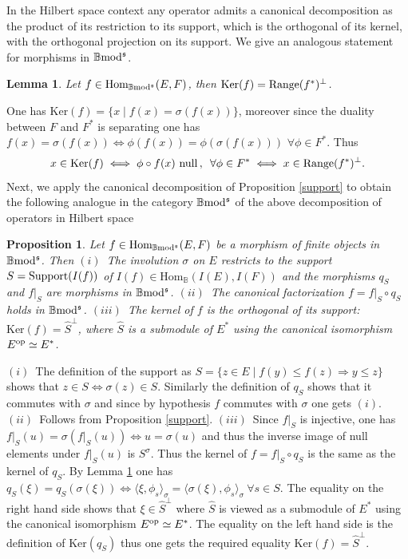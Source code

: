 \documentclass[12pt]{article}
\newtheorem{prop}[thm]{Proposition}
\newtheorem{lem}[thm]{Lemma}
\def\Hom{{\rm Hom}}
\def\B{{\mathbb B}}
\def\qqq{\,,\,~\forall}
\def\ker{{\mbox{Ker}}}
\def\Hom {{\mbox{Hom}}}
\def\b2{{\rm \B mod^{\mathfrak s}}}
\begin{document}
   In the Hilbert space context any operator admits a canonical decomposition as the product of its restriction to its support, which is the orthogonal of its kernel, with the orthogonal projection on its support. We give an analogous statement for morphisms in $\b2$.
    \begin{lem}\label{ortho proj} Let $f\in \Hom_\b2(E,F)$, then $\ker(f)={\rm Range}(f^*)^\perp$.
      \end{lem}
   \proof  One has $\ker(f)=\{x\mid f(x)=\sigma(f(x))\}$, moreover since the duality between $F$ and $F^*$ is separating one has $f(x)=\sigma(f(x))\iff \phi(f(x))=\phi(\sigma(f(x)))$ $\forall \phi\in F^*$. Thus 
   $$
   x\in \ker(f)\iff \phi\circ f(x)\ {\rm null}\qqq \phi\in F^*\iff x\in {\rm Range}(f^*)^\perp.
   $$
      \endproof    
   Next, we apply the canonical decomposition of Proposition \ref{support} to obtain the
   following analogue in the category $\b2$ of  the above decomposition of operators in Hilbert space    
   \begin{prop}\label{support bmods} Let $f\in \Hom_\b2(E,F)$ be a morphism of finite objects in $\b2$. Then\newline
   $(i)$~The involution $\sigma$ on $E$ restricts to the support $S={\rm Support}(I(f))$ of $I(f)\in \Hom_\B(I(E),I(F))$ and the morphisms $q_S$ and $f\vert_S$ are morphisms in $\b2$.\newline
   $(ii)$~The canonical factorization $f=f\vert_S\circ q_S$ holds in $\b2$.\newline
   $(iii)$~The kernel of $f$ is the orthogonal of its support:
   $
   \ker(f)=\hat S^\perp
   $, 
   where $\hat S$ is a submodule of $E^*$ using the canonical isomorphism $E^{\rm op}\simeq E^*$.   	
  \end{prop}
   \proof $(i)$~The definition of the support as $S=\{z\in E\mid f(y)\leq f(z)\Rightarrow y\leq z\}$ shows that $z\in S\iff \sigma(z)\in S$. Similarly the definition of $q_S$ shows that it commutes with $\sigma$ and since by hypothesis $f$ commutes with $\sigma$ one gets $(i)$.\newline
   $(ii)$~Follows from Proposition \ref{support}.   
   \newline
   $(iii)$~Since  $f\vert_S$ is injective, one has $f\vert_S(u)=\sigma(f\vert_S(u))\iff u=\sigma(u)$ and thus the inverse image of null elements under $f\vert_S(u)$ is $S^\sigma$. Thus the kernel of $f=f\vert_S\circ q_S$ is the same as the kernel of $q_S$.
   By Lemma \ref{ortho proj} one has 
   $
   q_S(\xi)=q_S(\sigma(\xi))\Leftrightarrow \langle \xi,\phi_s\rangle_\sigma=\langle\sigma(\xi),\phi_s\rangle_\sigma~ \forall s\in S
   $. 
   The equality on the right hand side shows that $\xi\in \hat S^\perp
   $ 
   where $\hat S$ is viewed as a submodule of $E^*$ using the canonical isomorphism $E^{\rm op}\simeq E^*$. The equality on the left hand side is the definition of $\ker(q_S)$ thus one gets the required equality $ \ker(f)=\hat S^\perp$. \endproof
   
\end{document}

